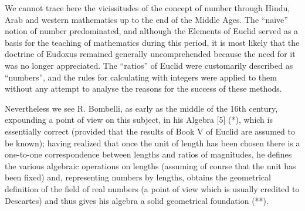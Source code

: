 We cannot trace here the vicissitudes of the concept of number through Hindu, Arab and western mathematics up to the end of the Middle Ages. The ``naïve'' notion of number predominated, and although the Elements of Euclid served as a basis for the teaching of mathematics during this period, it is most likely that the doctrine of Eudoxus remained generally uncomprehended because the need for it was no longer appreciated. The ``ratios'' of Euclid were customarily described as ``numbers'', and the rules for calculating with integers were applied to them without any attempt to analyse the reasons for the success of these methods.

Nevertheless we see R. Bombelli, as early as the middle of the 16th century, expounding a point of view on this subject, in his Algebra {[}5{]} (*), which is essentially correct (provided that the results of Book V of Euclid are assumed to be known); having realized that once the unit of length has been chosen there is a one-to-one correspondence between lengths and ratios of magnitudes, he defines the various algebraic operations on lengths (assuming of course that the unit has been fixed) and, representing numbers by lengths, obtains the geometrical definition of the field of real numbers (a point of view which is usually credited to Descartes) and thus gives his algebra a solid geometrical foundation (**).

